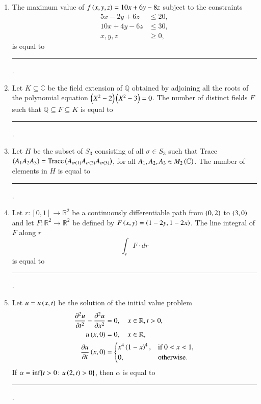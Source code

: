\documentclass[journal,12pt,onecolumn]{IEEEtran}
\theoremstyle{remark}
\begin{document}
\begin{enumerate}
\item The maximum value of $f\left(x, y, z\right) = 10x + 6y - 8z$ subject to the constraints
\begin{align*}
    5x - 2y + 6z &\le 20, \\
    10x + 4y - 6z &\le 30, \\
    x, y, z &\ge 0,
\end{align*}
is equal to \rule{3cm}{0.15mm} . \hfill{}

\item Let $K \subseteq \mathbb{C}$ be the field extension of $\mathbb{Q}$ obtained by adjoining all the roots of the polynomial equation $\left(X^2 - 2\right)\left(X^2 - 3\right) = 0$. The number of distinct fields $F$ such that $\mathbb{Q} \subseteq F \subseteq K$ is equal to \rule{3cm}{0.15mm} . \hfill{}

\item Let $H$ be the subset of $S_3$ consisting of all $\sigma \in S_3$ such that Trace$\left(A_1 A_2 A_3\right) = \text{Trace}\left(A_{\sigma\left(1\right)} A_{\sigma\left(2\right)} A_{\sigma\left(3\right)}\right)$, for all $A_1, A_2, A_3 \in M_2\left(\mathbb{C}\right)$. The number of elements in $H$ is equal to \rule{3cm}{0.15mm} . \hfill{}

\item Let $r \colon [0, 1] \to \mathbb{R}^2$ be a continuously differentiable path from $\left(0, 2\right)$ to $\left(3, 0\right)$ and let $F \colon \mathbb{R}^2 \to \mathbb{R}^2$ be defined by $F\left(x, y\right) = \left(1 - 2y, 1 - 2x\right)$. The line integral of $F$ along $r$
\[ \int_r F \cdot dr \]
is equal to \rule{3cm}{0.15mm} . \hfill{}

\item Let $u = u\left(x, t\right)$ be the solution of the initial value problem
\begin{align*}
    \frac{\partial^2 u}{\partial t^2} - \frac{\partial^2 u}{\partial x^2} &= 0, \quad x \in \mathbb{R}, t > 0, \\
    u\left(x, 0\right) &= 0, \quad x \in \mathbb{R}, \\
    \frac{\partial u}{\partial t}\left(x, 0\right) &= \begin{cases} x^4\left(1-x\right)^4, & \text{if } 0 < x < 1, \\ 0, & \text{otherwise.} \end{cases}
\end{align*}
If $\alpha = \inf\{t > 0 \colon u\left(2, t\right) > 0\}$, then $\alpha$ is equal to \rule{3cm}{0.15mm} . \hfill{}


\end{enumerate}
\end{document}
